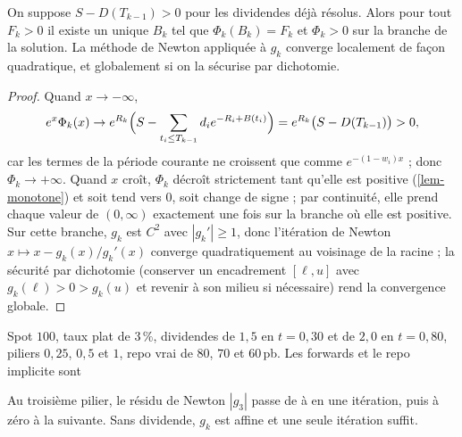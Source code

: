 \begin{proposition}\label{prop-bootstrap}
On suppose $S-D(T_{k-1})>0$ pour les dividendes déjà résolus. Alors pour tout $F_k>0$ il existe un unique $B_k$ tel que
$\Phi_k(B_k)=F_k$ et $\Phi_k>0$ sur la branche de la solution. La méthode de Newton appliquée à $g_k$ converge
localement de façon quadratique, et globalement si on la sécurise par dichotomie.
\end{proposition}
\begin{proof}
Quand $x\to-\infty$,
\[
e^{x}\Phi_k(x)\to e^{R_k}\Bigl(S-\sum_{t_i\le T_{k-1}}d_ie^{-R_i+B(t_i)}\Bigr)=e^{R_k}\bigl(S-D(T_{k-1})\bigr)>0,
\]
car les termes de la période courante ne croissent que comme $e^{-(1-w_i)x}$ ; donc $\Phi_k\to+\infty$. Quand $x$ croît,
$\Phi_k$ décroît strictement tant qu'elle est positive (\cref{lem-monotone}) et soit tend vers $0$, soit change de
signe ; par continuité, elle prend chaque valeur de $(0,\infty)$ exactement une fois sur la branche où elle est
positive. Sur cette branche, $g_k$ est $C^2$ avec $|g_k'|\ge1$, donc l'itération de Newton $x\mapsto x-g_k(x)/g_k'(x)$
converge quadratiquement au voisinage de la racine ; la sécurité par dichotomie (conserver un encadrement $[\ell,u]$
avec $g_k(\ell)>0>g_k(u)$ et revenir à son milieu si nécessaire) rend la convergence globale.
\end{proof}

\begin{example}\label{ex-bootstrap}
Spot $100$, taux plat de $3\,\%$, dividendes de $1{,}5$ en $t=0{,}30$ et de $2{,}0$ en $t=0{,}80$, piliers $0{,}25$,
$0{,}5$ et $1$, repo vrai de $80$, $70$ et $60$\,pb. Les forwards et le repo implicite sont
\begin{center}\end{center}
Au troisième pilier, le résidu de Newton $|g_3|$ passe de \vNewtonA{} à \vNewtonB{} en une itération, puis à zéro à
la suivante. Sans dividende, $g_k$ est affine et une seule itération suffit.
\end{example}

